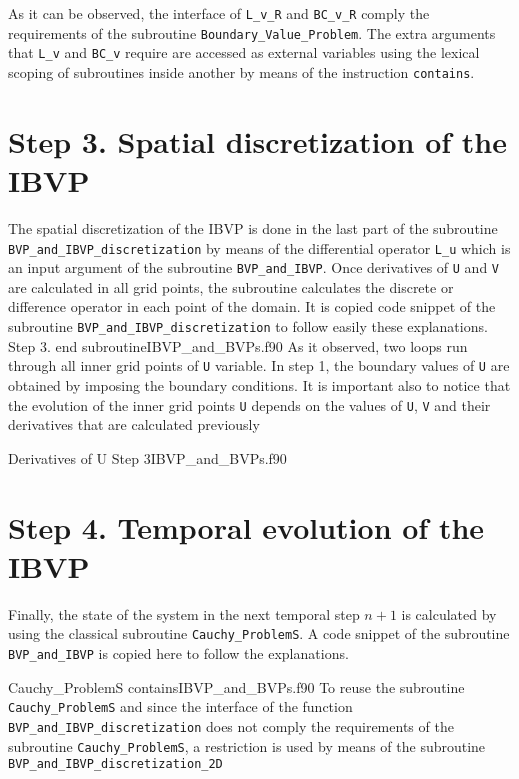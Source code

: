 As it can be observed, the interface of \verb|L_v_R| and \verb|BC_v_R| comply  the requirements of the subroutine \verb|Boundary_Value_Problem|. The extra arguments that \verb|L_v| and \verb|BC_v| require are accessed as external variables using the lexical scoping of subroutines inside another by means of the instruction \verb|contains|.
 
\section{Step 3. Spatial discretization of the IBVP}
The spatial discretization of the IBVP is done in the last part of the subroutine \verb|BVP_and_IBVP_discretization|  by means of the differential operator \verb|L_u| which is an input argument of the subroutine \verb|BVP_and_IBVP|. Once derivatives of \verb|U| and \verb|V| are calculated in all grid points, the subroutine calculates the discrete or difference operator in each point of the domain.  
It is copied code snippet of the subroutine \verb|BVP_and_IBVP_discretization| to follow easily these explanations.  
\vspace{0.5cm} 
{Step 3.}
{end subroutine}{IBVP_and_BVPs.f90}
As it observed, two loops run through all inner grid points of \verb|U| variable. In step 1, the boundary values of \verb|U| are obtained by imposing the boundary conditions. It is important also to notice that the evolution of the inner grid points \verb|U| depends on the values of \verb|U|,  \verb|V| and  their derivatives that are calculated previously

\vspace{0.1cm} 
{Derivatives of U}
{Step 3}{IBVP_and_BVPs.f90}

 

\section{Step 4. Temporal evolution of the IBVP}
Finally, the state of the system in the next temporal step $ n+1$ is calculated by using the classical subroutine
\verb|Cauchy_ProblemS|. A code snippet of the subroutine \verb|BVP_and_IBVP| is copied here to follow the explanations. 

\vspace{0.5cm} 
{Cauchy_ProblemS}
{contains}{IBVP_and_BVPs.f90}
To reuse the subroutine \verb|Cauchy_ProblemS| and since the interface of the function \verb|BVP_and_IBVP_discretization| does not comply the requirements of the subroutine \verb|Cauchy_ProblemS|, a restriction is used by means of the subroutine \verb|BVP_and_IBVP_discretization_2D|


